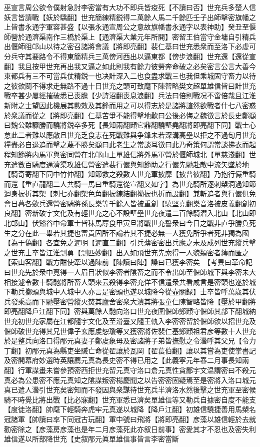巫宣言周公欲令僕射急討李密當有大功不即兵皆疫死【不讀曰否】世充兵多楚人信妖言皆請戰【妖於驕翻】世充簡練精鋭得二萬餘人馬二千餘匹壬子出師撃密旗幡之上皆書永通字軍容甚盛【以張永通宣周公之意故旗幡書永通字以表神助】癸丑至偃師營於通濟渠南作三橋於渠上【通濟渠大業元年所開】密留王伯當守金墉自引精兵出偃師阻邙山以待之密召諸將會議【將即亮翻】裴仁基曰世充悉衆而至洛下必虚可分兵守其要路令不得東簡精兵三萬傍河西出以逼東都【傍步浪翻】世充還【還從宣翻】我且按甲世充再出我又逼之如此則我有餘力彼勞奔命破之必矣密言公言大善今東都兵有三不可當兵仗精鋭一也决計深入二也食盡求戰三也我但乘城固守畜力以待之彼欲鬬不得求走無路不過十日世充之頭可致麾下陳智略樊文超單雄信皆曰計世充戰卒甚少屢經摧破悉已喪膽【少詩沼翻喪息浪翻】兵法曰倍則戰况不啻倍哉且江淮新附之士望因此機展其勲效及其鋒而用之可以得志於是諸將諠然欲戰者什七八密惑於衆議而從之【將即亮翻】仁基苦爭不能得撃地歎曰公後必悔之魏徵言於長史鄭頲曰魏公雖驟勝而驍將鋭卒多死【長知兩翻頲它鼎翻驍堅堯翻將即亮翻下同】戰士心怠此二者難以應敵且世充乏食志在死戰難與争鋒未若深溝高壘以拒之不過旬月世充糧盡必自退追而撃之蔑不勝矣頲曰此老生之常談耳徵曰此乃奇策何謂常談拂衣而起程知節將内馬軍與密同營在北邙山上單雄信將外馬軍營於偃師城北【單慈淺翻】世充遣數百騎度通濟渠攻雄信營密遣裴行儼與知節助之行儼先馳赴敵中流矢墜於地【騎奇寄翻下同中竹仲翻】知節救之殺數人世充軍披靡【披普彼翻】乃抱行儼重騎而還【重直龍翻二人共騎一馬曰重騎還從宣翻又如字】為世充騎所逐刺槊洞過知節迴身捩折其槊【刺七亦翻槊色角翻捩練結翻拗捩也折而設翻】兼斬追者與行儼俱免會日暮各歛兵還營密騎將孫長樂等千餘人皆被重創【驍堅堯翻樂音洛被皮義翻創初良翻】密新破宇文化及有輕世充之心不設壁壘世充夜遣二百餘騎潜入北山【北山即北邙山】伏谿谷中命軍士皆秣馬蓐食甲寅旦將戰世充誓衆曰今日之戰非直爭勝負死生之分在此一舉若其捷也富貴固所不論若其不捷必無一人獲免所爭者死非獨為國【為于偽翻】各宜免之遲明【遲直二翻】引兵薄密密出兵應之未及成列世充縱兵撃之世充士卒皆江淮剽勇【剽匹妙翻】出入如飛世充先索得一人貌類密者縳而匿之【索山客翻】戰方酣使牽以過陳前【陳讀曰陣】譟曰已獲李密矣　【考異曰革命記曰世充先於衆中覔得一人眉目狀似李密者隂畜之而不令出師至偃師城下與李密未大相接遽令數十騎馳將所畜人頭來云殺得李密充佯不信遣衆共看咸言是密頭也遂於城下勒兵擲頭與城中人城中人亦言是密頭也遂以城降今從壺關録】士卒皆呼萬歲其伏兵發乘高而下馳壓密營縱火焚其廬舍密衆大潰其將張童仁陳智略皆降【壓於甲翻將即亮翻降戶江翻下同】密與萬餘人馳向洛口世充夜圍偃師鄭頲守偃師其部下翻城納世充初世充家屬在江都隨宇文化及至滑臺又隨王軌入李密密留於偃師欲以招世充及偃師破世充得其兄世偉子玄應䖍恕瓊等又獲密將佐裴仁基鄭頲祖君彦等數十人世充於是整兵向洛口得邴元真妻子鄭䖍象母及密諸將子弟皆撫慰之令濳呼其父兄【令力丁翻】初邴元真為縣吏坐贓亡命從翟讓於瓦岡【翟萇伯翻】讓以其嘗為吏使掌書記及密開幕府妙選時英讓薦元真為長史密不得已用之【此義寜元年春二月事長知兩翻】行軍謀畫未嘗參預密西拒世充留元真守洛口倉元真性貪鄙宇文温謂密曰不殺元真必為公患密不應元真知之隂謀叛密楊慶聞之以告密密固疑焉至是密將入洛口城元真已遣人濳引世充矣密知而不發因與衆謀待世充兵半濟洛水然後擊之世充軍至密候騎不時覺比將出戰【比必寐翻】世充軍悉已濟矣單雄信等又勒兵自據密自度不能支【度徒洛翻】帥麾下輕騎奔虎牢元真遂以城降【降戶江翻】初雄信驍捷善用馬槊名冠諸軍【帥讀曰率下同冠古玩翻】軍中號曰飛將【將即亮翻】彦藻以雄信輕於去就勸密除之【彦藻房彦藻也是年二月彦藻死此亦叙日前事】密愛其才不忍也及密失利雄信遂以所部降世充【史叙邴元眞單雄信事皆言李密當斷